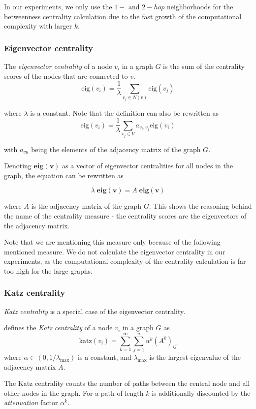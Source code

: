 In our experiments, we only use the $1-$ and $2-hop$ neighborhoods for the betweenness centrality calculation due to the fast growth of the computational complexity with larger $k$.

\subsubsection{Eigenvector centrality}
The \textit{eigenvector centrality} of a node $v_i$ in a graph $G$ is the sum of the centrality scores of the nodes that are connected to $v$.
$$
\text{eig}(v_i) = \frac{1}{\lambda} \sum_{v_j \in N(v)} \text{eig}(v_j)
$$

where $\lambda$ is a constant. Note that the definition can also be rewritten as 
$$
\text{eig}(v_i) = \frac{1}{\lambda} \sum_{v_j \in V} a_{v_i, v_j} \text{eig}(v_i)
$$

with $a_{vu}$ being the elements of the adjacency matrix of the graph $G$.

Denoting $\mathbf{eig(v)}$ as a vector of eigenvector centralities for all nodes in the graph, the equation can be rewritten as

$$
\lambda \; \mathbf{eig(v)} = A \; \mathbf{eig(v)}
$$

where $A$ is the adjacency matrix of the graph $G$. 
This shows the reasoning behind the name of the centrality measure - the centrality scores are the eigenvectors of the adjacency matrix.

Note that we are mentioning this measure only because of the following mentioned measure.
We do not calculate the eigenvector centrality in our experiments, as the computational complexity of the centrality calculation is far too high for the large graphs.

\subsubsection{Katz centrality}\label{def:katz-centrality}
\textit{Katz centrality} is a special case of the eigenvector centrality.

\cite{Katz1953} defines the \textit{Katz centrality} of a node $v_i$ in a graph $G$ as
$$
\text{katz}(v_i) = \sum_{k=1}^{\infty} \sum_{j=1}^n \alpha^k (A^k)_{ij}
$$
where $\alpha \in (0, 1/\lambda_{\text{max}})$ is a constant, and $\lambda_{\text{max}}$ is the largest eigenvalue of the adjacency matrix $A$.

The Katz centrality counts the number of paths between the central node and all other nodes in the graph.
For a path of length $k$ is additionally discounted by the \textit{attenuation} factor $\alpha^k$.

